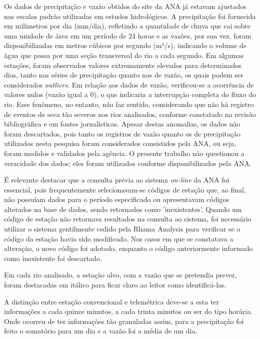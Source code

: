 Os dados de precipitação e vazão obtidos do site da ANA já estavam ajustados nas escalas padrão utilizadas em estudos hidrológicos. A precipitação foi fornecida em milímetros por dia (mm/dia), refletindo a quantidade de chuva que cai sobre uma unidade de área em um período de 24 horas e as vazões, por sua vez, foram disponibilizadas em metros cúbicos por segundo (m³/s), indicando o volume de água que passa por uma seção transversal do rio a cada segundo. Em algumas estações, foram observados valores extremamente elevados para determinados dias, tanto nas séries de precipitação quanto nas de vazão, os quais podem ser considerados \textit{outliers}. Em relação aos dados de vazão, verificou-se a ocorrência de valores nulos (vazão igual a 0), o que indicaria a interrupção completa do fluxo do rio. Esse fenômeno, no entanto, não faz sentido, considerando que não há registro de eventos de seca tão severos nos rios analisados, conforme constatado na revisão bibliográfica e em fontes jornalísticas. Apesar destas anomalias, os dados não foram descartados, pois tanto os registros de vazão quanto os de precipitação utilizados nesta pesquisa foram considerados consistidos pela ANA, ou seja, foram medidos e validados pela agência. O presente trabalho não questionou a veracidade dos dados; eles foram utilizados conforme disponibilizados pela ANA.

É relevante destacar que a consulta prévia ao sistema \textit{on-line} da ANA foi essencial, pois frequentemente selecionavam-se códigos de estação que, ao final, não possuíam dados para o período especificado ou apresentavam códigos alterados na base de dados, sendo retornados como 'inexistentes'. Quando um código de estação não retornava resultados na consulta ao sistema, foi necessário utilizar o sistema gentilmente cedido pela Rhama Analysis para verificar se o código da estação havia sido modificado. Nos casos em que se constatava a alteração, o novo código foi adotado, enquanto o código anteriormente informado como inexistente foi descartado.

Em cada rio analisado, a estação alvo, com a vazão que se pretendia prever, foram destacadas em itálico para ficar claro ao leitor como identificá-las.

A distinção entre estação convencional e telemétrica deve-se a esta ter informações a cada quinze minutos, a cada trinta minutos ou ser do tipo horária. Onde ocorreu de ter informações tão granuladas assim, para a precipitação foi feito o somatório para um dia e a vazão foi a média de um dia.

